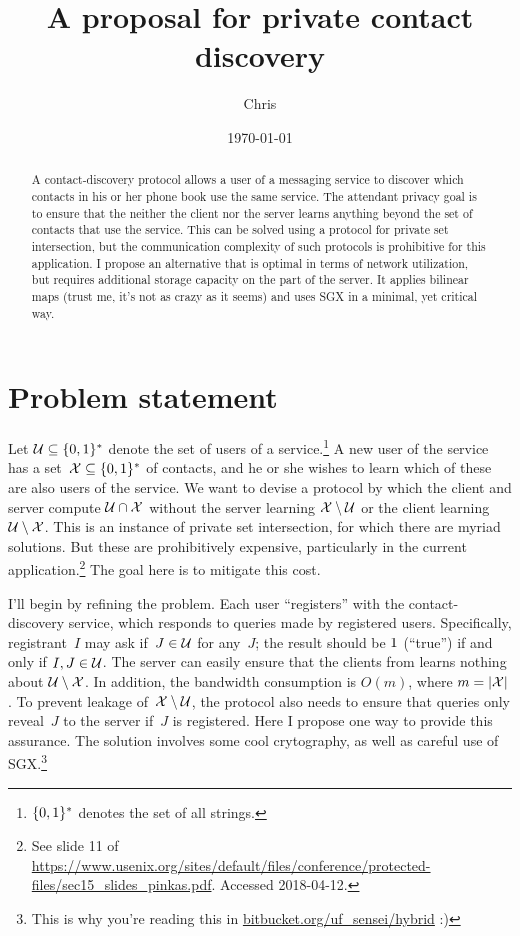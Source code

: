 \documentclass{build/llncs}
\date{\today}
\title{A proposal for private contact discovery}
\author{Chris}
\institute{}
\begin{document}
\maketitle

\begin{abstract}
  A contact-discovery protocol allows a user of a messaging service to discover
  which contacts in his or her phone book use the same service. The attendant
  privacy goal is to ensure that the neither the client nor the server learns
  anything beyond the set of contacts that use the service.
  This can be solved using a protocol for private set intersection, but the
  communication complexity of such protocols is prohibitive for this
  application.
  I propose an alternative that is optimal in terms of network utilization,
  but requires additional storage capacity on the part of the server. It applies
  bilinear maps (trust me, it's not as crazy as it seems) and uses SGX in a
  minimal, yet critical way.
\end{abstract}

\section*{Problem statement}

Let $\mathcal{U} \subseteq \{0,1\}^*$ denote the set of users of a
service.\footnote{$\{0,1\}^*$ denotes the set of all strings.}
%
A new user of the service has a set~$\mathcal{X} \subseteq \{0,1\}^*$ of contacts, and he
or she wishes to learn which of these are also users of the service.
%
We want to devise a protocol by which the client and server compute $\mathcal{U}
\cap \mathcal{X}$ without the server learning $\mathcal{X} \setminus \mathcal{U}$ or the client
learning $\mathcal{U} \setminus \mathcal{X}$.
%
This is an instance of private set intersection, for which there are myriad
solutions. But these are prohibitively expensive, particularly in the current
application.\footnote{See slide 11 of
\url{https://www.usenix.org/sites/default/files/conference/protected-files/sec15_slides_pinkas.pdf}.
Accessed 2018-04-12.}
%
The goal here is to mitigate this cost.

I'll begin by refining the problem. Each user ``registers'' with the
contact-discovery service, which responds to queries made by registered users.
%
Specifically, registrant~$I$ may ask if~$J\in\mathcal{U}$ for any~$J$; the result should
be $1$ (``true'') if and only if $I, J \in \mathcal{U}$.
%
The server can easily ensure that the clients from learns nothing about $\mathcal{U}
\setminus \mathcal{X}$. In addition, the bandwidth consumption is $O(m)$, where $m=|\mathcal{X}|$.
%
To prevent leakage of~$\mathcal{X} \setminus \mathcal{U}$, the protocol also needs to ensure that
queries only reveal~$J$ to the server if~$J$ is registered. Here I propose one
way to provide this assurance. The solution involves some cool crytography, as
well as careful use of SGX.\footnote{This is why you're reading this in
\url{bitbucket.org/uf_sensei/hybrid} :)}
\end{document}
